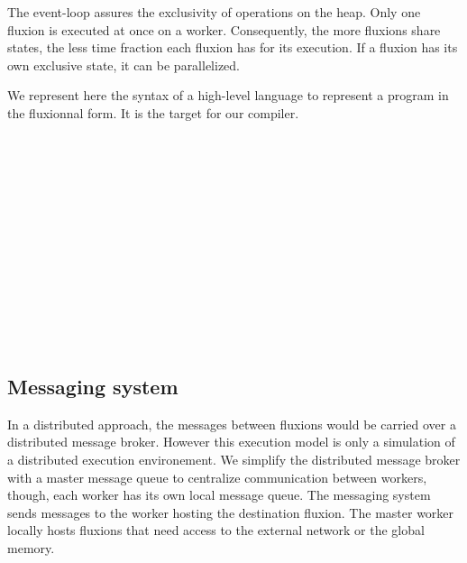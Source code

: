 The event-loop assures the exclusivity of operations on the heap.
Only one fluxion is executed at once on a worker.
Consequently, the more fluxions share states, the less time fraction each fluxion has for its execution.
If a fluxion has its own exclusive state, it can be parallelized.

We represent here the syntax of a high-level language to represent a program in the fluxionnal form.
It is the target for our compiler.
\begin{bnf*}
      { \bnfor {} \bnfsp {} \bnfsp {}}\\
          { \bnfsp {} \bnfsp {} \bnfsp {} \bnfsp {} \bnfsp {} \bnfsp {} \bnfsp {}}\\
       { \bnfsp {} \bnfor {}}\\
      { \bnfor {} \bnfor {} \bnfsp {} \bnfsp {}}\\
       { \bnfsp {} }\\
         {}\\
          {\bnfts{\texttt{\{}}  \bnfts{\texttt{\}}}}\\
          {\bnfts{\texttt{[}}  \bnfts{\texttt{]}}}\\
         { \bnfor {} \bnfsp \bnfts{,} \bnfsp {}}\\
           {\bnfts{\texttt{>}\texttt{>}} \bnfor \bnfts{\texttt{-}\texttt{>}}}\\
           {}\\
           {}\\
\end{bnf*}
\vspace{-2.5\baselineskip}


\subsection{Messaging system}

In a distributed approach, the messages between fluxions would be carried over a distributed message broker.
However this execution model is only a simulation of a distributed execution environement.
We simplify the distributed message broker with a master message queue to centralize communication between workers, though, each worker has its own local message queue.
The messaging system sends messages to the worker hosting the destination fluxion.
The master worker locally hosts fluxions that need access to the external network or the global memory.

